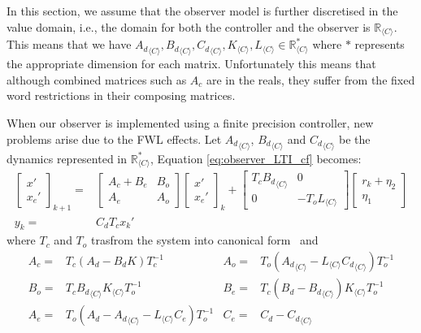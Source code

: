 \documentclass[sigconf]{llncs}
\newcommand{\mat}[1]{{#1}}
\renewcommand{\vec}[1]{{#1}}
\begin{document}
In this section, we assume that the observer model is further discretised in
the value domain, i.e., the domain for both
the controller and the observer is $\mathbb{R}_{\langle C \rangle}$.
This means that we have 
${\mat{A}_d}_{\langle C
\rangle},{\mat{B}_d}_{\langle C \rangle},{\mat{C}_d}_{\langle C \rangle},
\mat{K}_{\langle C \rangle}, \mat{L}_{\langle C \rangle} \in
\mathbb{R}_{\langle C \rangle}^*$ where $*$ represents the appropriate
dimension for each matrix.  Unfortunately this means that although combined
matrices such as $\mat{A}_c$ are in the reals, they suffer from the fixed
word restrictions in their composing matrices.

When our observer is implemented using a finite precision controller, new
problems arise due to the FWL effects.  Let ${\mat{A}_d}_{\langle C
\rangle}$, ${\mat{B}_d}_{\langle C \rangle}$ and ${\mat{C}_d}_{\langle C
\rangle}$ be the dynamics represented in $\mathbb{R}_{\langle C\rangle}^*$,
Equation \eqref{eq:observer_LTI_cf} becomes:
%
\begin{align}
\left [\begin{array}{c}\vec{x}'\\ \vec{x}_e' \end{array}\right]_{k+1}
=& \left [\begin{array}{cc}\mat{A}_{c}+\mat{B}_{e}&\mat{B}_{o}\\ \mat{A}_{e}&\mat{A}_{o}\end{array}\right]
\left [\begin{array}{c}\vec{x}'\\ \vec{x}_e' \end{array}\right]_k
+\left[\begin{array}{cc}\mat{T}_c{\mat{B}_d}_{\langle C \rangle}&\mat{0}\\\mat{0}&-\mat{T}_o\mat{L}_{\langle C \rangle}\end{array}\right]\left [\begin{array}{c} \vec{r}_k + \vec{\eta}_2\\ \vec{\eta}_1\end{array}\right]\nonumber\\
\vec{y}_k=&\mat{C}_d\mat{T}_c\vec{x}_k'%
\label{eq:observer_LTI_FWL_cf}
\end{align}
where $\mat{T}_c$ and $\mat{T}_o$ trasfrom the system into canonical form~\cite{Astrom08} and
{\setlength{\abovedisplayskip}{2pt}
\setlength{\belowdisplayskip}{2pt}
\begin{align*}
\mat{A}_{c}=&\mat{T}_c\left(\mat{A}_d-\mat{B}_d\mat{K}\right)\mat{T}_c^{-1}&
\mat{A}_{o}=&\mat{T}_o\left({\mat{A}_d}_{\langle C \rangle}-\mat{L}_{\langle C \rangle}{\mat{C}_d}_{\langle C \rangle}\right)\mat{T}_o^{-1}\\
\mat{B}_{o}=&\mat{T}_c{\mat{B}_d}_{\langle C \rangle}\mat{K}_{\langle C \rangle}\mat{T}_o^{-1}&
\mat{B}_{e}=&\mat{T}_c(\mat{B}_d-{\mat{B}_d}_{\langle C \rangle})\mat{K}_{\langle C \rangle}\mat{T}_o^{-1}\\
\mat{A}_{e}=&\mat{T}_o\left(\mat{A}_d-{\mat{A}_d}_{\langle C \rangle}-\mat{L}_{\langle C \rangle}\mat{C}_e\right)\mat{T}_o^{-1}&
\mat{C}_{e}=&\mat{C}_d-{\mat{C}_d}_{\langle C \rangle}
\end{align*}
}
\end{document}
